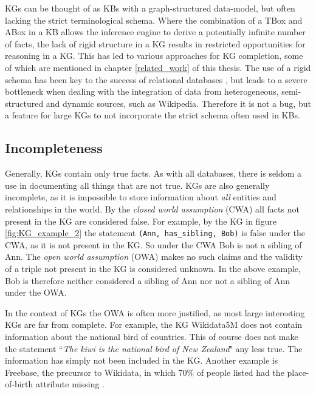 KGs can be thought of as KBs with a graph-structured data-model, but often lacking the strict terminological schema. Where the combination of a TBox and ABox in a KB allows the inference engine to derive a potentially infinite number of facts, the lack of rigid structure in a KG results in restricted opportunities for reasoning in a KG. This has led to various approaches for KG completion, some of which are mentioned in chapter \ref{related_work} of this thesis. The use of a rigid schema has been key to the success of relational databases \cite{codd2002relational}, but leads to a severe bottleneck when dealing with the integration of data from heterogeneous, semi-structured and dynamic sources, such as Wikipedia. Therefore it is not a bug, but a feature for large KGs to not incorporate the strict schema often used in KBs.

\subsection{Incompleteness}
\label{Integrity_of_KGs}
Generally, KGs contain only true facts. As with all databases, there is seldom a use in documenting all things that are not true. KGs are also generally incomplete, as it is impossible to store information about \textit{all} entities and relationships in the world. By the \textit{closed world assumption} (CWA) all facts not present in the KG are considered false. For example, by the KG in figure \ref{fig:KG_example_2} the statement \texttt{(Ann, has\_sibling, Bob)} is false under the CWA, as it is not present in the KG. So under the CWA Bob is not a sibling of Ann. The \textit{open world assumption} (OWA) makes no such claims and  the validity of a triple not present in the KG is considered unknown. In the above example, Bob is therefore neither considered a sibling of Ann nor not a sibling of Ann under the OWA.

In the context of KGs the OWA is often more justified, as most large interesting KGs are far from complete. For example, the KG Wikidata5M does not contain information about the national bird of countries. This of course does not make the statement ``\textit{The kiwi is the national bird of New Zealand}" any less true. The information has simply not been included in the KG. Another example is Freebase, the precursor to Wikidata, in which 70\% of people listed had the place-of-birth attribute missing \cite{west2014knowledge}.


